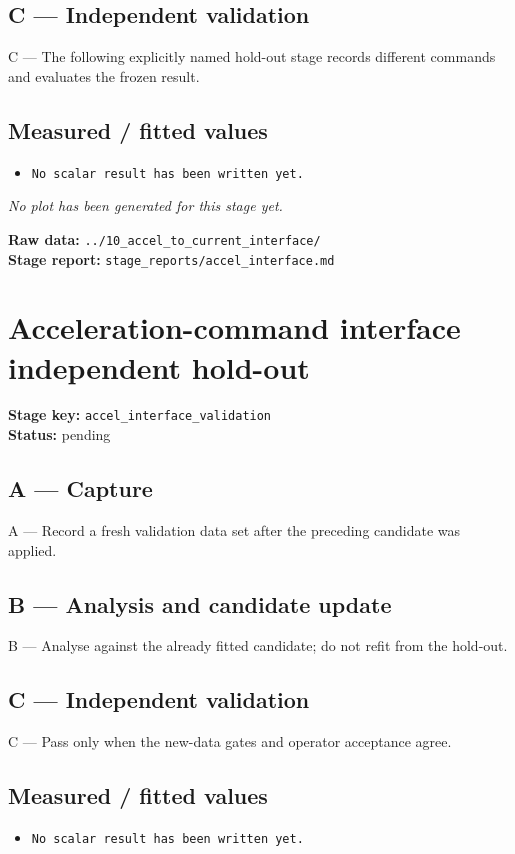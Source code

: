 \documentclass[11pt,a4paper]{article}
\begin{document}
\subsection*{C --- Independent validation}
C — The following explicitly named hold-out stage records different commands and evaluates the frozen result.

\subsection*{Measured / fitted values}
\begin{itemize}\setlength\itemsep{0pt}
\item \texttt{No scalar result has been written yet.}
\end{itemize}

\textit{No plot has been generated for this stage yet.}

\vfill
\textbf{Raw data:} \texttt{../10\_accel\_to\_current\_interface/}\\
\textbf{Stage report:} \texttt{stage\_reports/accel\_interface.md}
\clearpage
\small
\section*{Acceleration-command interface independent hold-out}
\textbf{Stage key:} \texttt{accel\_interface\_validation}\\
\textbf{Status:} pending\\

\subsection*{A --- Capture}
A — Record a fresh validation data set after the preceding candidate was applied.

\subsection*{B --- Analysis and candidate update}
B — Analyse against the already fitted candidate; do not refit from the hold-out.

\subsection*{C --- Independent validation}
C — Pass only when the new-data gates and operator acceptance agree.

\subsection*{Measured / fitted values}
\begin{itemize}\setlength\itemsep{0pt}
\item \texttt{No scalar result has been written yet.}
\end{itemize}
\end{document}
